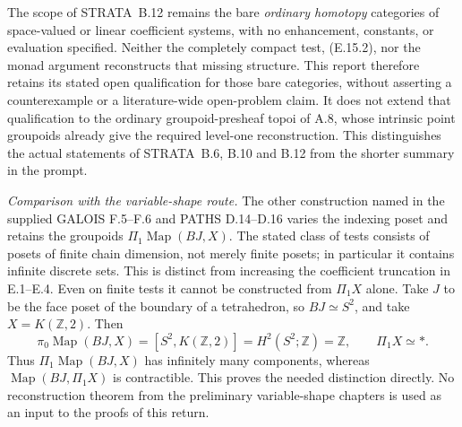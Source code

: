The scope of STRATA~B.12 remains the bare \emph{ordinary homotopy}
categories of space-valued or linear coefficient systems, with no
enhancement, constants, or evaluation specified. Neither the
completely compact test, (E.15.2), nor the monad argument reconstructs
that missing structure. This report therefore retains its stated
open qualification for those bare categories, without asserting a
counterexample or a literature-wide open-problem claim. It does not
extend that qualification to the ordinary groupoid-presheaf topoi of
A.8, whose intrinsic point groupoids already give the required
level-one reconstruction. This distinguishes the actual statements
of STRATA~B.6, B.10 and B.12 from the shorter summary in the prompt.

\medskip
\noindent\emph{Comparison with the variable-shape route.}
The other construction named in the supplied GALOIS F.5--F.6 and
PATHS D.14--D.16 varies the indexing poset and retains the groupoids
$\Pi_1\operatorname{Map}(BJ,X)$. The stated class of tests consists
of posets of finite chain dimension, not merely finite posets;
in particular it contains infinite discrete sets. This is distinct
from increasing the coefficient truncation in E.1--E.4.
Even on finite tests it cannot be constructed from $\Pi_1X$ alone.
Take $J$ to be the face poset of the boundary of a tetrahedron, so
$BJ\simeq S^2$, and take $X=K(\mathbb Z,2)$. Then
\[
 \pi_0\operatorname{Map}(BJ,X)
       =[S^2,K(\mathbb Z,2)]
       =H^2(S^2;\mathbb Z)=\mathbb Z,
 \qquad \Pi_1X\simeq *.
\]
Thus $\Pi_1\operatorname{Map}(BJ,X)$ has infinitely many components,
whereas $\operatorname{Map}(BJ,\Pi_1X)$ is contractible.
This proves the needed distinction directly. No reconstruction
theorem from the preliminary variable-shape chapters is used as
an input to the proofs of this return.
